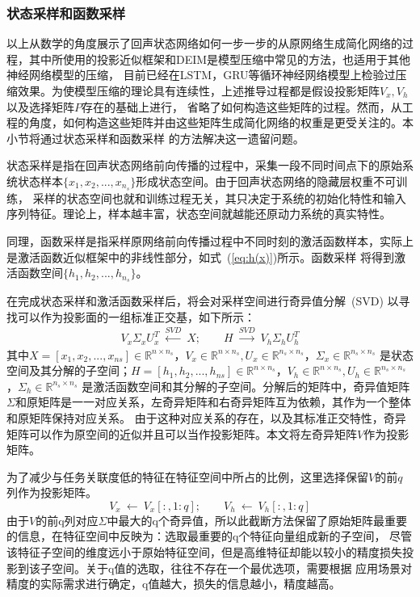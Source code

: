 \subsubsection{状态采样和函数采样}
以上从数学的角度展示了回声状态网络如何一步一步的从原网络生成简化网络的过程，其中所使用的投影近似框架和DEIM是模型压缩中常见的方法，也适用于其他神经网络模型的压缩，
目前已经在LSTM，GRU等循环神经网络模型上检验过压缩效果。为使模型压缩的理论具有连续性，上述推导过程都是假设投影矩阵\(V_x,V_h\)以及选择矩阵\(P\)存在的基础上进行，
省略了如何构造这些矩阵的过程。然而，从工程的角度，如何构造这些矩阵并由这些矩阵生成简化网络的权重是更受关注的。本小节将通过状态采样和函数采样
的方法解决这一遗留问题。

状态采样是指在回声状态网络前向传播的过程中，采集一段不同时间点下的原始系统状态样本\(\{x_1,x_2,...,x_{n_s}\}\)形成状态空间。由于回声状态网络的隐藏层权重不可训练，
采样的状态空间也就和训练过程无关，其只决定于系统的初始化特性和输入序列特征。理论上，样本越丰富，状态空间就越能还原动力系统的真实特性。

同理，函数采样是指采样原网络前向传播过程中不同时刻的激活函数样本，实际上是激活函数近似框架中的非线性部分，如式~(\ref{eq:h(x)})所示。函数采样
将得到激活函数空间\(\{h_1,h_2,...,h_{n_s}\}\)。

在完成状态采样和激活函数采样后，将会对采样空间进行奇异值分解~(SVD) 以寻找可以作为投影面的一组标准正交基，如下所示：
\begin{equation}
	\begin{split}
		V_x \Sigma_x U_x^T \ \xleftarrow{SVD} \ X;	\qquad	H \ \xrightarrow{SVD} \ V_h \Sigma_h U_h^T 	
	\end{split}
\end{equation}
其中\(X = [x_1,x_2,...,x_{ns}] \in \mathbb{R}^{n \times n_s} \)，\(V_x \in \mathbb{R}^{n \times n_s},U_x \in \mathbb{R}^{n_s \times n_s}\)，\(\Sigma_x \in \mathbb{R}^{n_s \times n_s}\)
是状态空间及其分解的子空间；\(H = [h_1,h_2,...,h_{ns}] \in \mathbb{R}^{n \times n_s} \)，\(V_h \in \mathbb{R}^{n \times n_s},U_h \in \mathbb{R}^{n_s \times n_s}\)，\(\Sigma_h \in \mathbb{R}^{n_s \times n_s}\)
是激活函数空间和其分解的子空间。分解后的矩阵中，奇异值矩阵\(\Sigma\)和原矩阵是一一对应关系，左奇异矩阵和右奇异矩阵互为依赖，其作为一个整体和原矩阵保持对应关系。
由于这种对应关系的存在，以及其标准正交特性，奇异矩阵可以作为原空间的近似并且可以当作投影矩阵。本文将左奇异矩阵\(V\)作为投影矩阵。

为了减少与任务关联度低的特征在特征空间中所占的比例，这里选择保留\(V\)的前\(q\)列作为投影矩阵。
\begin{equation}
	V_x \ \leftarrow \ V_x[:,1:q];	\qquad V_h \ \leftarrow \ V_h[:,1:q]
\end{equation}
由于\(V\)的前q列对应\(\Sigma\)中最大的q个奇异值，所以此截断方法保留了原始矩阵最重要的信息，在特征空间中反映为：选取最重要的q个特征向量组成新的子空间，
尽管该特征子空间的维度远小于原始特征空间，但是高维特征却能以较小的精度损失投影到该子空间。关于q值的选取，往往不存在一个最优选项，需要根据
应用场景对精度的实际需求进行确定，q值越大，损失的信息越小，精度越高。

